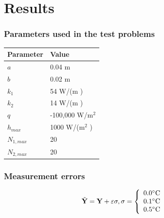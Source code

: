 \documentclass[aspectratio=169]{beamer}
\begin{document}
\section{Results}
\begin{frame}
	\frametitle{Parameters used in the test problems}
	\begin{table}[H]
		\centering
		\begin{tabular}{|l|l|}
			\hline
			\textbf{Parameter} & \textbf{Value}  \\ \hline
			$a$       & 0.04 m   \\ \hline
			$b$       & 0.02 m     \\ \hline
			$k_1$     & 54 W/(m \celsius)  \\ \hline
			$k_2$     & 14 W/(m \celsius) \\ \hline
			$q$       & -100,000 W/$\text{m}^2$ \\ \hline
			$h_{max}$       & 1000 W/($\text{m}^2$ \celsius) \\ \hline
			$N_{1,max}$       & 20 \\ \hline
			$N_{2,max}$       & 20 \\ \hline
		\end{tabular}		
		\label{tabela_params}
	\end{table}
\end{frame}
%

%
\begin{frame}
	\frametitle{Measurement errors}
	\begin{center}
		\begin{align*}
		& \tilde{\mathbf{Y}} = \mathbf{Y} + \mathbf{\varepsilon} \sigma, \sigma = 
		\left\lbrace \begin{array}{ll}
		0.0\celsius \\
		0.1\celsius \\
		0.5\celsius
		\end{array}\right .
		\end{align*}
	\end{center}
\end{frame}


%

%
\end{document}
